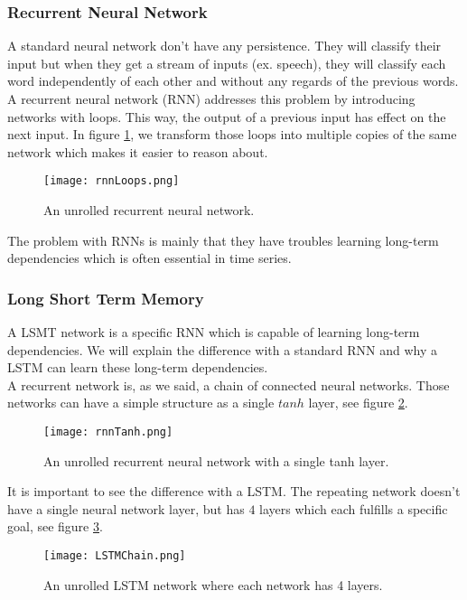 \subsubsection{Recurrent Neural Network}

A standard neural network don't have any persistence. They will classify their input but when they get a stream of inputs (ex. speech), they will classify each word independently of each other and without any regards of the previous words. A recurrent neural network (RNN) addresses this problem by introducing networks with loops. This way, the output of a previous input has effect on the next input. In figure \ref{fig:rnnLoops}, we transform those loops into multiple copies of the same network which makes it easier to reason about.

\begin{figure}[H]
	\centering
	\texttt{[image: rnnLoops.png]}
	\caption{An unrolled recurrent neural network.}
	\label{fig:rnnLoops}
\end{figure} 

The problem with RNNs is mainly that they have troubles learning long-term dependencies which is often essential in time series.


\subsubsection{Long Short Term Memory}

A LSMT network is a specific RNN which is capable of learning long-term dependencies. We will explain the difference with a standard RNN and why a LSTM can learn these long-term dependencies. \\

A recurrent network is, as we said, a chain of connected neural networks. Those networks can have a simple structure as a single $tanh$ layer, see figure \ref{fig:rnnTanh}.

\begin{figure}[H]
	\centering
	\texttt{[image: rnnTanh.png]}
	\caption{An unrolled recurrent neural network with a single tanh layer.}
	\label{fig:rnnTanh}
\end{figure} 

It is important to see the difference with a LSTM. The repeating network doesn't have a single neural network layer, but has $4$ layers which each fulfills a specific goal, see figure \ref{fig:LSTMChain}.

\begin{figure}[H]
	\centering
	\texttt{[image: LSTMChain.png]}
	\caption{An unrolled LSTM network where each network has 4 layers.}
	\label{fig:LSTMChain}
\end{figure} 

